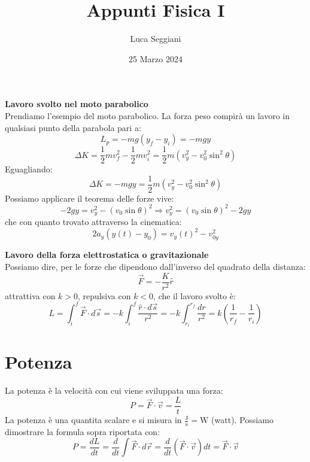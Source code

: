\documentclass[a4paper,12pt]{article}
\title{Appunti Fisica I}
\author{Luca Seggiani}
\date{25 Marzo 2024}
\begin{document}
\maketitle
\textbf{Lavoro svolto nel moto parabolico} \\
Prendiamo l'esempio del moto parabolico. La forza peso compirà un lavoro in qualsiasi punto della parabola pari a:
$$ L_p = -mg(y_f - y_i) = -mgy $$
$$ \Delta K = \frac{1}{2}mv_f^2 - \frac{1}{2}mv_i^2 = \frac{1}{2}m(v_y^2-v_0^2\sin^2{\theta})$$
Eguagliando:
$$ \Delta K = -mgy = \frac{1}{2}m(v_y^2-v_0^2\sin^2{\theta})$$
Possiamo applicare il teorema delle forze vive:
$$ -2gy=v_y^2-(v_0\sin{\theta})^2 \Rightarrow v_y^2 = (v_0\sin{\theta})^2 - 2gy$$
che con quanto trovato attraverso la cinematica:
$$ 2a_y(y(t)-y_0)=v_y(t)^2-v_{0y}^2$$
\par\smallskip
\textbf{Lavoro della forza elettrostatica o gravitazionale} \\
Possiamo dire, per le forze che dipendono dall'inverso del quadrato della distanza:
$$ \vec{F} = -\frac{K}{r^2}\hat{r} $$
attrattiva con $k>0$, repulsiva con $k<0$, che il lavoro svolto è:
$$ L = \int_i^f \vec{F}\cdot d\vec{s} = -k\int_i^f \frac{\hat{r} \cdot d\vec{s}}{r^2} = -k\int_{r_i}^{r_f}\frac{dr}{r^2} = k(\frac{1}{r_f} - \frac{1}{r_i})$$

\section{Potenza}
La potenza è la velocità con cui viene sviluppata una forza:
$$ P = \vec{F} \cdot \vec{v} = \frac{L}{t}$$
La potenza è una quantita scalare e si misura in $\frac{\mathrm{J}}{\mathrm{s}} = \mathrm{W}$ (watt).
Possiamo dimostrare la formula sopra riportata con:
$$ P = \frac{dL}{dt} = \frac{d}{dt}\int\vec{F}\cdot d\vec{r}= \frac{d}{dt}(\vec{F}\cdot\vec{v})dt = \vec{F}\cdot\vec{v} $$
\end{document}
